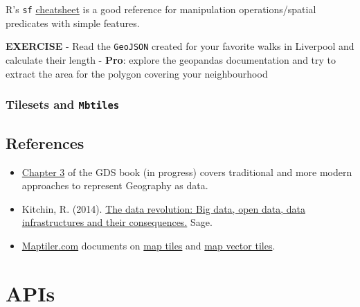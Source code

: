 \documentclass[
  letterpaper,
  DIV=11,
  numbers=noendperiod]{scrreprt}
\begin{document}
R's \texttt{sf}
\href{https://github.com/rstudio/cheatsheets/blob/main/sf.pdf}{cheatsheet}
is a good reference for manipulation operations/spatial predicates with
simple features.

\textbf{EXERCISE} - Read the \texttt{GeoJSON} created for your favorite
walks in Liverpool and calculate their length - \textbf{Pro}: explore
the geopandas documentation and try to extract the area for the polygon
covering your neighbourhood

\hypertarget{tilesets-and-mbtiles}{%
\subsection{\texorpdfstring{Tilesets and
\texttt{Mbtiles}}{Tilesets and Mbtiles}}\label{tilesets-and-mbtiles}}

\hypertarget{references-2}{%
\section{References}\label{references-2}}

\begin{itemize}
\item
  \href{https://geographicdata.science/book/notebooks/03_spatial_data.html}{Chapter
  3} of the GDS book (in progress) covers traditional and more modern
  approaches to represent Geography as data.
\item
  Kitchin, R. (2014).
  \href{https://www.perlego.com/book/860829/the-data-revolution-big-data-open-data-data-infrastructures-and-their-consequences-pdf?utm_source=google\&utm_medium=cpc\&campaignid=15781033413\&adgroupid=134828831187\&gclid=CjwKCAiAzp6eBhByEiwA_gGq5Otph9MDAPkgkT_yBOH3u8Z0rRiL8TLCr32xzW5pY_uIIjTV7r4S7RoCMXsQAvD_BwE}{The
  data revolution: Big data, open data, data infrastructures and their
  consequences.} Sage.
\item
  \href{https://www.maptiler.com/}{Maptiler.com} documents on
  \href{https://www.maptiler.com/google-maps-coordinates-tile-bounds-projection/\#3/15.00/50.00}{map
  tiles} and
  \href{https://www.maptiler.com/news/2019/02/what-are-vector-tiles-and-why-you-should-care/}{map
  vector tiles}.
\end{itemize}


\hypertarget{apis}{%
\chapter{APIs}\label{apis}}
\end{document}
